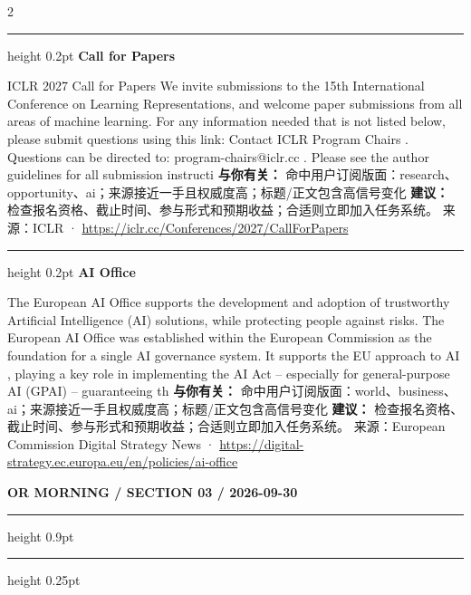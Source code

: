 \documentclass[10.5pt]{ctexart}
\begin{document}
\begin{multicols}{2}
\vspace{2mm}
\hrule height 0.2pt
\vspace{2mm}
{\large\bfseries Call for Papers}\par
ICLR 2027 Call for Papers We invite submissions to the 15th International Conference on Learning Representations, and welcome paper submissions from all areas of machine learning. For any information needed that is not listed below, please submit questions using this link: Contact ICLR Program Chairs . Questions can be directed to: program-chairs@iclr.cc . Please see the author guidelines for all submission instructi
\textbf{与你有关：} 命中用户订阅版面：research、opportunity、ai；来源接近一手且权威度高；标题/正文包含高信号变化
\textbf{建议：} 检查报名资格、截止时间、参与形式和预期收益；合适则立即加入任务系统。
{\footnotesize\color{ormuted} 来源：ICLR · \url{https://iclr.cc/Conferences/2027/CallForPapers}}
\vspace{2mm}
\hrule height 0.2pt
\vspace{2mm}
{\large\bfseries AI Office}\par
The European AI Office supports the development and adoption of trustworthy Artificial Intelligence (AI) solutions, while protecting people against risks. The European AI Office was established within the European Commission as the foundation for a single AI governance system. It supports the EU approach to AI , playing a key role in implementing the AI Act – especially for general-purpose AI (GPAI) – guaranteeing th
\textbf{与你有关：} 命中用户订阅版面：world、business、ai；来源接近一手且权威度高；标题/正文包含高信号变化
\textbf{建议：} 检查报名资格、截止时间、参与形式和预期收益；合适则立即加入任务系统。
{\footnotesize\color{ormuted} 来源：European Commission Digital Strategy News · \url{https://digital-strategy.ec.europa.eu/en/policies/ai-office}}
\end{multicols}
\newpage
{\small\bfseries OR MORNING / SECTION 03 / 2026-09-30}
\vspace{2mm}
\hrule height 0.9pt
\vspace{1.5mm}
\hrule height 0.25pt
\vspace{4mm}
\end{document}
